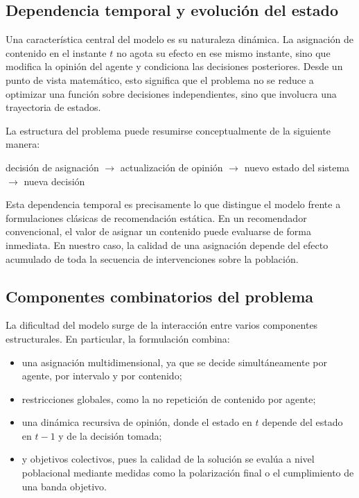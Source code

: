 \documentclass[10pt,letterpaper]{article}
\begin{document}
\subsection{Dependencia temporal y evoluci\'on del estado}

Una caracter\'istica central del modelo es su naturaleza din\'amica. La asignaci\'on de contenido en el instante \(t\) no agota su efecto en ese mismo instante, sino que modifica la opini\'on del agente y condiciona las decisiones posteriores. Desde un punto de vista matem\'atico, esto significa que el problema no se reduce a optimizar una funci\'on sobre decisiones independientes, sino que involucra una trayectoria de estados.

La estructura del problema puede resumirse conceptualmente de la siguiente manera:

\begin{center}
decisi\'on de asignaci\'on
\(\rightarrow\)
actualizaci\'on de opini\'on
\(\rightarrow\)
nuevo estado del sistema
\(\rightarrow\)
nueva decisi\'on
\end{center}

Esta dependencia temporal es precisamente lo que distingue el modelo frente a formulaciones cl\'asicas de recomendaci\'on est\'atica. En un recomendador convencional, el valor de asignar un contenido puede evaluarse de forma inmediata. En nuestro caso, la calidad de una asignaci\'on depende del efecto acumulado de toda la secuencia de intervenciones sobre la poblaci\'on.

\subsection{Componentes combinatorios del problema}

La dificultad del modelo surge de la interacci\'on entre varios componentes estructurales. En particular, la formulaci\'on combina:

\begin{itemize}
    \item una asignaci\'on multidimensional, ya que se decide simult\'aneamente por agente, por intervalo y por contenido;
    \item restricciones globales, como la no repetici\'on de contenido por agente;
    \item una din\'amica recursiva de opini\'on, donde el estado en \(t\) depende del estado en \(t-1\) y de la decisi\'on tomada;
    \item y objetivos colectivos, pues la calidad de la soluci\'on se eval\'ua a nivel poblacional mediante medidas como la polarizaci\'on final o el cumplimiento de una banda objetivo.
\end{itemize}
\end{document}
